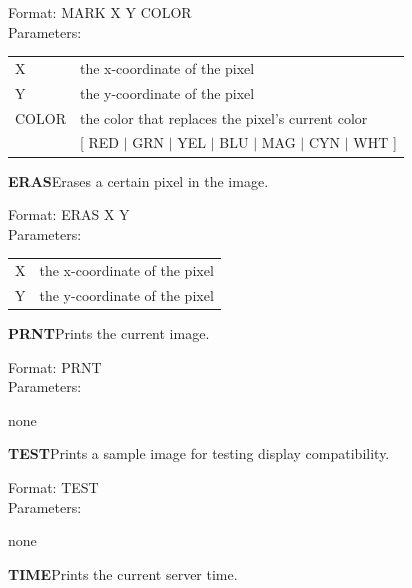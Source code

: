 \documentclass[letterpaper]{article}
\begin{document}
\begin{adjustwidth}{2em}{0em}
    Format: MARK X Y COLOR\\
    Parameters:
    \begin{adjustwidth}{1em}{0em}
    \begin{tabular}{ l l }
        X & the x-coordinate of the pixel\\
        Y & the y-coordinate of the pixel\\
        COLOR & the color that replaces the pixel's current color\\
        & [ RED $\vert$ GRN $\vert$ YEL $\vert$ BLU $\vert$ MAG $\vert$ CYN $\vert$ WHT ]
    \end{tabular}
    \end{adjustwidth}
\end{adjustwidth}

\textbf{ERAS}\quad Erases a certain pixel in the image.

\begin{adjustwidth}{2em}{0em}
    Format: ERAS X Y\\
    Parameters:
    \begin{adjustwidth}{1em}{0em}
    \begin{tabular}{ l l }
        X & the x-coordinate of the pixel\\
        Y & the y-coordinate of the pixel
    \end{tabular}
    \end{adjustwidth}
\end{adjustwidth}

\textbf{PRNT}\quad Prints the current image.

\begin{adjustwidth}{2em}{0em}
    Format: PRNT\\
    Parameters:
    \begin{adjustwidth}{1em}{0em}
    none
    \end{adjustwidth}
\end{adjustwidth}

\textbf{TEST}\quad Prints a sample image for testing display compatibility.

\begin{adjustwidth}{2em}{0em}
    Format: TEST\\
    Parameters:
    \begin{adjustwidth}{1em}{0em}
    none
    \end{adjustwidth}
\end{adjustwidth}

\textbf{TIME}\quad Prints the current server time.
\end{document}
